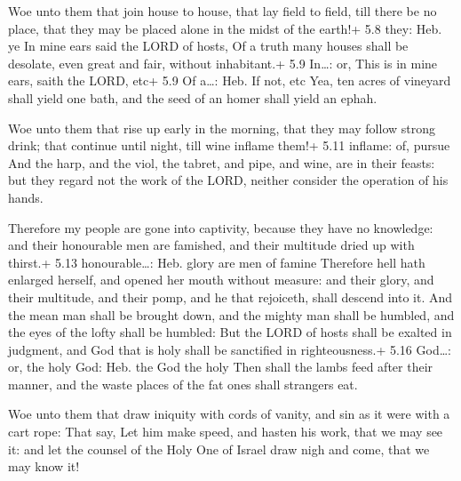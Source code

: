  Woe unto them that join house to house, that lay field to
field, till there be no place, that they may be placed alone in the
midst of the earth!+ 5.8 they: Heb. ye  In mine ears said
the LORD of hosts, Of a truth many houses shall be desolate, even great
and fair, without inhabitant.+ 5.9 In\ldots: or, This is in mine ears,
saith the LORD, etc+ 5.9 Of a\ldots: Heb. If not, etc  Yea,
ten acres of vineyard shall yield one bath, and the seed of an homer
shall yield an ephah.

 Woe unto them that rise up early in the morning, that
they may follow strong drink; that continue until night, till wine
inflame them!+ 5.11 inflame: of, pursue  And the harp, and
the viol, the tabret, and pipe, and wine, are in their feasts: but they
regard not the work of the LORD, neither consider the operation of his
hands.

 Therefore my people are gone into captivity, because
they have no knowledge: and their honourable men are famished, and their
multitude dried up with thirst.+ 5.13 honourable\ldots: Heb. glory are
men of famine  Therefore hell hath enlarged herself, and
opened her mouth without measure: and their glory, and their multitude,
and their pomp, and he that rejoiceth, shall descend into it.
 And the mean man shall be brought down, and the mighty man
shall be humbled, and the eyes of the lofty shall be humbled:
 But the LORD of hosts shall be exalted in judgment, and
God that is holy shall be sanctified in righteousness.+ 5.16 God\ldots:
or, the holy God: Heb. the God the holy  Then shall the
lambs feed after their manner, and the waste places of the fat ones
shall strangers eat.

 Woe unto them that draw iniquity with cords of vanity, and
sin as it were with a cart rope:  That say, Let him make
speed, and hasten his work, that we may see it: and let the counsel of
the Holy One of Israel draw nigh and come, that we may know it!

